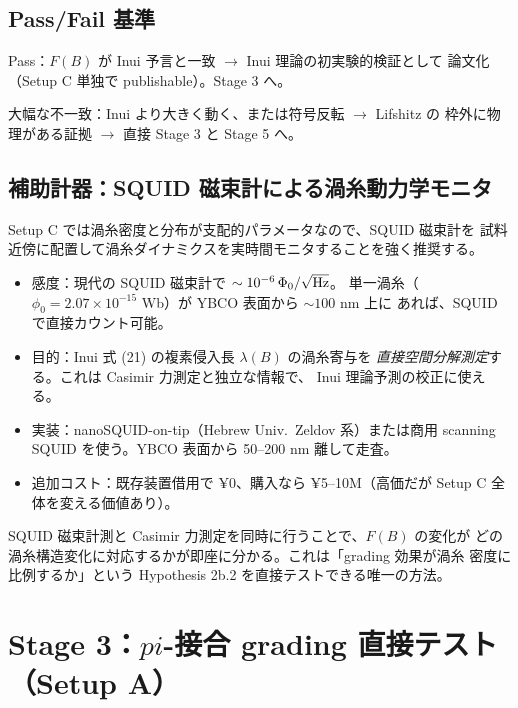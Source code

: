 \documentclass[11pt,a4paper]{article}
\def\pi{pi}%
\def\textbf#1{#1}%
\begin{document}
\subsection{Pass/Fail 基準}

\textbf{Pass}：$F(B)$ が Inui 予言と一致 $\to$ Inui 理論の初実験的検証として
論文化（Setup C 単独で publishable）。Stage 3 へ。

\textbf{大幅な不一致}：Inui より大きく動く、または符号反転 $\to$ Lifshitz の
枠外に物理がある証拠 $\to$ 直接 Stage 3 と Stage 5 へ。

\subsection{補助計器：SQUID 磁束計による渦糸動力学モニタ}

Setup C では渦糸密度と分布が支配的パラメータなので、\textbf{SQUID 磁束計を
試料近傍に配置して渦糸ダイナミクスを実時間モニタ}することを強く推奨する。

\begin{itemize}
\item \textbf{感度}：現代の SQUID 磁束計で $\sim 10^{-6}\,\Phi_0/\sqrt{\rm Hz}$。
  単一渦糸（$\phi_0 = 2.07\times 10^{-15}$ Wb）が YBCO 表面から $\sim 100$ nm 上に
  あれば、SQUID で直接カウント可能。
\item \textbf{目的}：Inui 式 (21) の複素侵入長 $\lambda(B)$ の渦糸寄与を
  \emph{直接空間分解測定}する。これは Casimir 力測定と独立な情報で、
  Inui 理論予測の校正に使える。
\item \textbf{実装}：nanoSQUID-on-tip（Hebrew Univ.\ Zeldov 系）または商用
  scanning SQUID を使う。YBCO 表面から 50--200 nm 離して走査。
\item \textbf{追加コスト}：既存装置借用で ¥0、購入なら ¥5--10M（高価だが Setup C
  全体を変える価値あり）。
\end{itemize}

SQUID 磁束計測と Casimir 力測定を同時に行うことで、$F(B)$ の変化が
\textbf{どの渦糸構造変化に対応するか}が即座に分かる。これは「grading 効果が渦糸
密度に比例するか」という Hypothesis 2b.2 を直接テストできる唯一の方法。

\newpage

\section{Stage 3：$\pi$-接合 grading 直接テスト（Setup A）}
\end{document}
